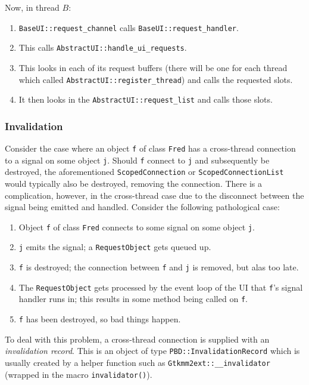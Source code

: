\documentclass[10pt,a4paper]{book}
\newcommand{\code}[1]{\texttt{#1}}
\begin{document}
Now, in thread $B$:

\begin{enumerate}
\item \code{BaseUI::request\_channel} calls \code{BaseUI::request\_handler}.
\item This calls \code{AbstractUI::handle\_ui\_requests}.
\item This looks in each of its request buffers (there will be one for
  each thread which called \code{AbstractUI::register\_thread}) and calls the requested slots.
\item It then looks in the \code{AbstractUI::request\_list} and calls those slots.
\end{enumerate}


\subsubsection{Invalidation}

Consider the case where an object \code{f} of class \code{Fred} has a
cross-thread connection to a signal on some object \code{j}.  Should
\code{f} connect to \code{j} and subsequently be destroyed, the
aforementioned \code{ScopedConnection} or \code{ScopedConnectionList}
would typically also be destroyed, removing the connection.  There is
a complication, however, in the cross-thread case due to the
disconnect between the signal being emitted and handled.  Consider the
following pathological case:

\begin{enumerate}
\item Object \code{f} of class \code{Fred} connects to some signal on some object \code{j}.
\item \code{j} emits the signal; a \code{RequestObject} gets queued up.
\item \code{f} is destroyed; the connection between \code{f} and
  \code{j} is removed, but alas too late.
\item The \code{RequestObject} gets processed by the event loop of the
  UI that \code{f}'s signal handler runs in; this results in some
  method being called on \code{f}.
\item \code{f} has been destroyed, so bad things happen.
\end{enumerate}

To deal with this problem, a cross-thread connection is supplied with
an \emph{invalidation record}.  This is an object of type
\code{PBD::InvalidationRecord} which is usually created by a helper
function such as \code{Gtkmm2ext::\_\_invalidator} (wrapped in the macro
\code{invalidator()}).
\end{document}
